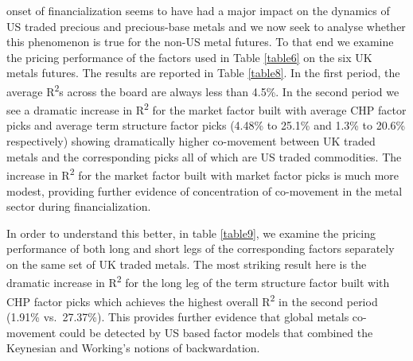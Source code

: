 \documentclass[12pt,]{article}
\begin{document}
onset of financialization seems to have had a major impact on the
dynamics of US traded precious and precious-base metals and we now seek
to analyse whether this phenomenon is true for the non-US metal futures.
To that end we examine the pricing performance of the factors used in
Table \ref{table6} on the six UK metals futures. The results are
reported in Table \ref{table8}. In the first period, the average
R\textsuperscript{2}s across the board are always less than 4.5\%. In
the second period we see a dramatic increase in R\textsuperscript{2} for
the market factor built with average CHP factor picks and average term
structure factor picks (4.48\% to 25.1\% and 1.3\% to 20.6\%
respectively) showing dramatically higher co-movement between UK traded
metals and the corresponding picks all of which are US traded
commodities. The increase in R\textsuperscript{2} for the market factor
built with market factor picks is much more modest, providing further
evidence of concentration of co-movement in the metal sector during
financialization.

In order to understand this better, in table \ref{table9}, we examine
the pricing performance of both long and short legs of the corresponding
factors separately on the same set of UK traded metals. The most
striking result here is the dramatic increase in R\textsuperscript{2}
for the long leg of the term structure factor built with CHP factor
picks which achieves the highest overall R\textsuperscript{2} in the
second period (1.91\% vs.~27.37\%). This provides further evidence that
global metals co-movement could be detected by US based factor models
that combined the Keynesian and Working's notions of backwardation.
\end{document}
